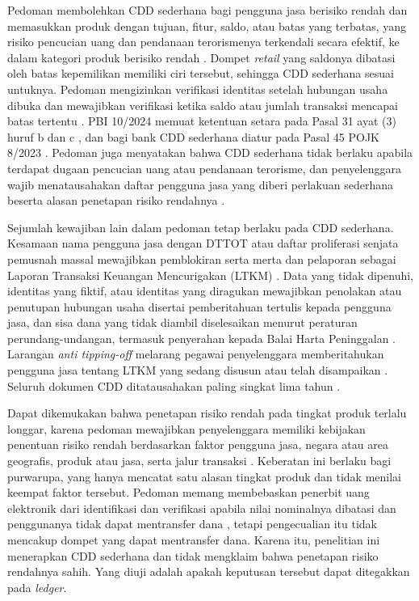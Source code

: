 Pedoman membolehkan CDD sederhana bagi pengguna jasa berisiko rendah dan memasukkan produk dengan tujuan, fitur, saldo, atau batas yang terbatas, yang risiko pencucian uang dan pendanaan terorismenya terkendali secara efektif, ke dalam kategori produk berisiko rendah \cite[hlm.~38 dan 57]{bi2023pedoman}. Dompet \textit{retail} yang saldonya dibatasi oleh batas kepemilikan memiliki ciri tersebut, sehingga CDD sederhana sesuai untuknya. Pedoman mengizinkan verifikasi identitas setelah hubungan usaha dibuka dan mewajibkan verifikasi ketika saldo atau jumlah transaksi mencapai batas tertentu \cite[hlm.~38]{bi2023pedoman}. PBI 10/2024 memuat ketentuan setara pada Pasal 31 ayat (3) huruf b dan c \cite{bi2024pbi10}, dan bagi bank CDD sederhana diatur pada Pasal 45 POJK 8/2023 \cite{ojk2023pojk8}. Pedoman juga menyatakan bahwa CDD sederhana tidak berlaku apabila terdapat dugaan pencucian uang atau pendanaan terorisme, dan penyelenggara wajib menatausahakan daftar pengguna jasa yang diberi perlakuan sederhana beserta alasan penetapan risiko rendahnya \cite[hlm.~38]{bi2023pedoman}.

Sejumlah kewajiban lain dalam pedoman tetap berlaku pada CDD sederhana. Kesamaan nama pengguna jasa dengan DTTOT atau daftar proliferasi senjata pemusnah massal mewajibkan pemblokiran serta merta dan pelaporan sebagai Laporan Transaksi Keuangan Mencurigakan (LTKM) \cite[hlm.~31]{bi2023pedoman}. Data yang tidak dipenuhi, identitas yang fiktif, atau identitas yang diragukan mewajibkan penolakan atau penutupan hubungan usaha disertai pemberitahuan tertulis kepada pengguna jasa, dan sisa dana yang tidak diambil diselesaikan menurut peraturan perundang-undangan, termasuk penyerahan kepada Balai Harta Peninggalan \cite[hlm.~40]{bi2023pedoman}. Larangan \textit{anti tipping-off} melarang pegawai penyelenggara memberitahukan pengguna jasa tentang LTKM yang sedang disusun atau telah disampaikan \cite[hlm.~53]{bi2023pedoman}. Seluruh dokumen CDD ditatausahakan paling singkat lima tahun \cite[hlm.~52]{bi2023pedoman}.

Dapat dikemukakan bahwa penetapan risiko rendah pada tingkat produk terlalu longgar, karena pedoman mewajibkan penyelenggara memiliki kebijakan penentuan risiko rendah berdasarkan faktor pengguna jasa, negara atau area geografis, produk atau jasa, serta jalur transaksi \cite[hlm.~38]{bi2023pedoman}. Keberatan ini berlaku bagi purwarupa, yang hanya mencatat satu alasan tingkat produk dan tidak menilai keempat faktor tersebut. Pedoman memang membebaskan penerbit uang elektronik dari identifikasi dan verifikasi apabila nilai nominalnya dibatasi dan penggunanya tidak dapat mentransfer dana \cite[hlm.~38]{bi2023pedoman}, tetapi pengecualian itu tidak mencakup dompet yang dapat mentransfer dana. Karena itu, penelitian ini menerapkan CDD sederhana dan tidak mengklaim bahwa penetapan risiko rendahnya sahih. Yang diuji adalah apakah keputusan tersebut dapat ditegakkan pada \textit{ledger}.

